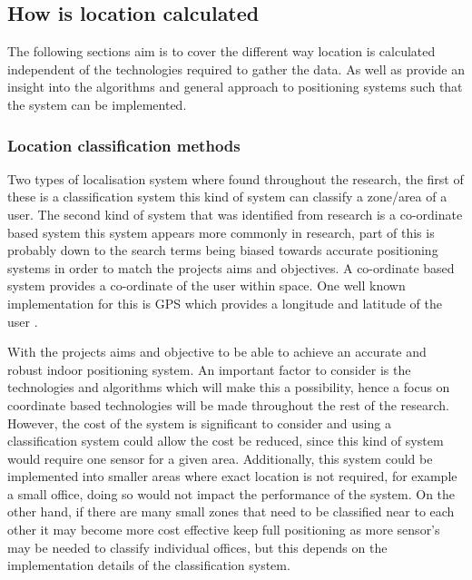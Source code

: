 \subsection{How is location calculated}
The following sections aim is to cover the different way location is calculated independent of the technologies required to gather the data. As well as provide an insight into the algorithms and general approach to positioning systems such that the system can be implemented. 

\subsubsection{Location classification methods}
Two types of localisation system where found throughout the research, the first of these is a classification system this kind of system can classify a zone/area of a user.
The second kind of system that was identified from research is a co-ordinate based system this system appears more commonly in research, part of this is probably down to the search terms being biased towards accurate positioning systems in order to match the projects aims and objectives. A co-ordinate based system provides a co-ordinate of the user within space. One well known implementation for this is GPS which provides a longitude and latitude of the user \cite{kyes_2017_what}.

With the projects aims and objective to be able to achieve an accurate and robust indoor positioning system. An important factor to consider is the technologies and algorithms which will make this a possibility, hence a focus on coordinate based technologies will be made throughout the rest of the research. However, the cost of the system is significant to consider and using a classification system could allow the cost be reduced, since this kind of system would require one sensor for a given area. Additionally, this system could be implemented into smaller areas where exact location is not required, for example a small office, doing so would not impact the performance of the system. On the other hand, if there are many small zones that need to be classified near to each other it may become more cost effective keep full positioning as more sensor's may be needed to classify individual offices, but this depends on the implementation details of the classification system.  

